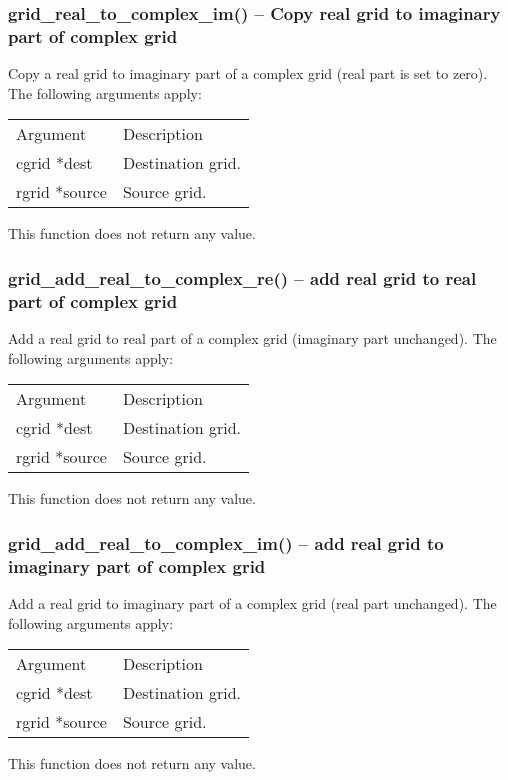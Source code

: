 \documentclass[12pt,letterpaper]{article}
\begin{document}
\subsubsection{grid\_real\_to\_complex\_im() -- Copy real grid to imaginary part of complex grid}

Copy a real grid to imaginary part of a complex grid (real part is set to zero). The following arguments apply:
\begin{longtable}{p{} p{}}
Argument & Description\\
\cline{1-2}
cgrid *dest & Destination grid.\\
rgrid *source & Source grid.\\
\end{longtable}
\noindent
This function does not return any value.

\subsubsection{grid\_add\_real\_to\_complex\_re() -- add real grid to real part of complex grid}

Add a real grid to real part of a complex grid (imaginary part unchanged). The following arguments apply:
\begin{longtable}{p{} p{}}
Argument & Description\\
\cline{1-2}
cgrid *dest & Destination grid.\\
rgrid *source & Source grid.\\
\end{longtable}
\noindent
This function does not return any value.

\subsubsection{grid\_add\_real\_to\_complex\_im() -- add real grid to imaginary part of complex grid}

Add a real grid to imaginary part of a complex grid (real part unchanged). The following arguments apply:
\begin{longtable}{p{} p{}}
Argument & Description\\
\cline{1-2}
cgrid *dest & Destination grid.\\
rgrid *source & Source grid.\\
\end{longtable}
\noindent
This function does not return any value.
\end{document}
